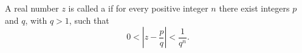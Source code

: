 A real number $z$ is called a  if for every positive integer $n$ there exist integers $p$ and $q$, with $q > 1$, such that $$0 < \left| z - \frac{p}{q} \right| < \frac{1}{q^n}.$$

